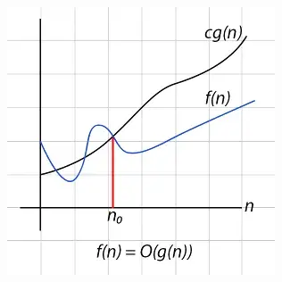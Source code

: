 \documentclass[10pt,aspectratio=43]{beamer}
\begin{document}
\begin{frame}
\begin{columns}
    \begin{column}{0.3\textwidth}
      \includegraphics[width=\textwidth]{figures/MasterTheorem/big_o.jpg}
    \end{column}
  \end{columns}
\end{frame}
\end{document}

